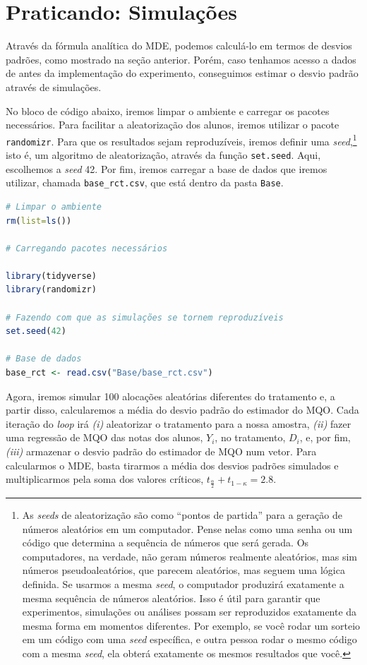 \section{Praticando: Simulações}

Através da fórmula analítica do MDE, podemos calculá-lo em termos de desvios padrões, como mostrado na seção anterior. Porém, caso tenhamos acesso a dados de antes da implementação do experimento, conseguimos estimar o desvio padrão através de simulações.

No bloco de código abaixo, iremos limpar o ambiente e carregar os pacotes necessários. Para facilitar a aleatorização dos alunos, iremos utilizar o pacote \texttt{randomizr}.  Para que os resultados sejam reproduzíveis, iremos definir uma \textit{seed},\footnote{As \textit{seeds} de aleatorização são como ``pontos de partida'' para a geração de números aleatórios em um computador. Pense nelas como uma senha ou um código que determina a sequência de números que será gerada. Os computadores, na verdade, não geram números realmente aleatórios, mas sim números pseudoaleatórios, que parecem aleatórios, mas seguem uma lógica definida. Se usarmos a mesma \textit{seed}, o computador produzirá exatamente a mesma sequência de números aleatórios. Isso é útil para garantir que experimentos, simulações ou análises possam ser reproduzidos exatamente da mesma forma em momentos diferentes. Por exemplo, se você rodar um sorteio em um código com uma \textit{seed} específica, e outra pessoa rodar o mesmo código com a mesma \textit{seed}, ela obterá exatamente os mesmos resultados que você.} isto é, um algoritmo de aleatorização, através da função \texttt{set.seed}. Aqui, escolhemos a \textit{seed} 42. Por fim, iremos carregar a base de dados que iremos utilizar, chamada \texttt{base\_rct.csv}, que está dentro da pasta \texttt{Base}.

\begin{boxH}
\begin{lstlisting}[language = R]
# Limpar o ambiente 
rm(list=ls())

# Carregando pacotes necessários

library(tidyverse)
library(randomizr)

# Fazendo com que as simulações se tornem reproduzíveis
set.seed(42)

# Base de dados
base_rct <- read.csv("Base/base_rct.csv")
\end{lstlisting}
\end{boxH}

Agora, iremos simular 100 alocações aleatórias diferentes do tratamento e, a partir disso, calcularemos a média do desvio padrão do estimador do MQO. Cada iteração do \textit{loop} irá \textit{(i)} aleatorizar o tratamento para a nossa amostra, \textit{(ii)} fazer uma regressão de MQO das notas dos alunos, $Y_i$, no tratamento, $D_i$, e, por fim, \textit{(iii)} armazenar o desvio padrão do estimador de MQO num vetor. Para calcularmos o MDE, basta tirarmos a média dos desvios padrões simulados e multiplicarmos pela soma dos valores críticos, $t_{\frac{\alpha}{2}} + t_{1-\kappa} = 2.8$.

